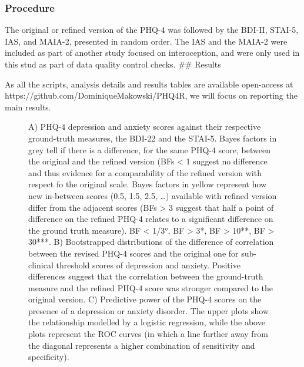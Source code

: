 \documentclass[
  man,
  floatsintext,
  longtable,
  nolmodern,
  notxfonts,
  notimes,
  colorlinks=true,linkcolor=blue,citecolor=blue,urlcolor=blue]{apa7}
\begin{document}
\subsubsection{Procedure}\label{procedure-1}

The original or refined version of the PHQ-4 was followed by the BDI-II,
STAI-5, IAS, and MAIA-2, presented in random order. The IAS and the
MAIA-2 were included as part of another study focused on interoception,
and were only used in this stud as part of data quality control checks.
\#\# Results

As all the scripts, analysis details and results tables are available
open-access at https://github.com/DominiqueMakowski/PHQ4R, we will focus
on reporting the main results.

\begin{figure}[!htbp]

{\caption{{A) PHQ-4 depression and anxiety scores against their
respective ground-truth measures, the BDI-22 and the STAI-5. Bayes
factors in grey tell if there is a difference, for the same PHQ-4 score,
between the original and the refined version (BFs \textless{} 1 suggest
no difference and thus evidence for a comparability of the refined
version with respect fo the original scale. Bayes factors in yellow
represent how new in-between scores (0.5, 1.5, 2.5, \ldots) available
with refined version differ from the adjacent scores (BFs \textgreater{}
3 suggest that half a point of difference on the refined PHQ-4 relates
to a significant difference on the ground truth measure). BF \textless{}
1/3°, BF \textgreater{} 3*, BF \textgreater{} 10**, BF \textgreater{}
30***. B) Bootstrapped distributions of the difference of correlation
between the revised PHQ-4 scores and the original one for sub-clinical
threshold scores of depression and anxiety. Positive differences suggest
that the correlation between the ground-truth measure and the refined
PHQ-4 score was stronger compared to the original version. C) Predictive
power of the PHQ-4 scores on the presence of a depression or anxiety
disorder. The upper plots show the relationship modelled by a logistic
regression, while the above plots represent the ROC curves (in which a
line further away from the diagonal represents a higher combination of
sensitivity and specificity).}{\label{fig-two}}}}


\end{figure}
\end{document}
